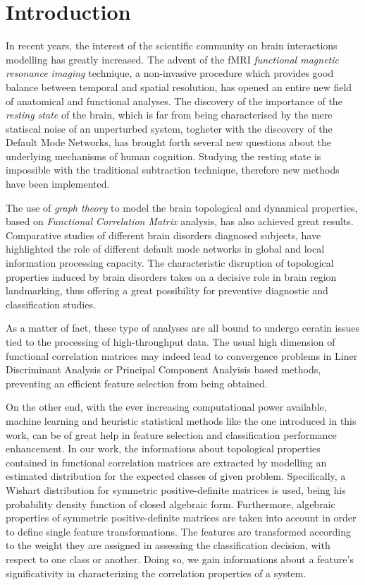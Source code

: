 \documentclass[12pt,openright,twoside,a4paper]{book}
\begin{document}
\frontmatter

\tableofcontents

\chapter{Introduction}

In recent years, the  interest of the scientific community on brain interactions modelling has greatly increased.
The advent of the fMRI \textit{functional magnetic resonance imaging} technique, a non-invasive procedure which provides good balance between temporal and spatial resolution, has opened an entire new field of anatomical and functional analyses.
The discovery of the importance of the \textit{resting state} of the brain, which is far from being characterised by the mere statiscal noise of an unperturbed system, togheter with the discovery of the Default Mode Networks, has brought forth several new questions about the underlying mechanisms of human cognition.
Studying the resting state is impossible with the traditional subtraction technique, therefore new methods have been implemented.

The use of \textit{graph theory} to model the brain topological and dynamical properties, based on \textit{Functional Correlation Matrix} analysis, has also achieved great results.
Comparative studies of different brain disorders diagnosed subjects, have highlighted the role of different default mode networks in global and local information processing capacity.
The characteristic disruption of topological properties induced by brain disorders takes on a decisive role in brain region landmarking, thus offering a great possibility for preventive diagnostic and classification studies.

As a matter of fact, these type of analyses are all bound to undergo ceratin issues tied to the  processing of high-throughput data.
The usual high dimension of functional correlation matrices may indeed lead to convergence problems in Liner Discriminant Analysis or Principal Component Analyisis based methods, preventing an efficient feature selection from being obtained.

On the other end, with the ever increasing computational power available, machine learning and heuristic statistical methods like the one introduced in this work, can be of great help in feature selection and classification performance enhancement.
In our work, the informations about topological properties contained in functional correlation matrices are extracted by modelling an estimated distribution for the expected classes of given problem.
Specifically, a Wishart distribution for symmetric positive-definite matrices is used, being his probability density function of closed algebraic form.
Furthermore, algebraic properties of symmetric positive-definite matrices are taken into account in order to define single feature transformations.
The features are transformed according to the weight they are assigned in assessing the classification decision, with respect to one class or another.
Doing so, we gain informations about a feature's significativity in characterizing the correlation properties of a system.
\end{document}
